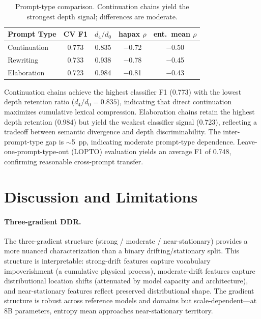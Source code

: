 \documentclass[11pt,a4paper]{article}
\begin{document}
\begin{table}[t]
\centering
\small
\caption{Prompt-type comparison. Continuation chains yield the strongest depth signal; differences are moderate.}
\label{tab:prompt}
\begin{tabular}{lcccc}
\toprule
\textbf{Prompt Type} & \textbf{CV F1} & \textbf{$d_4/d_0$} & \textbf{hapax $\rho$} & \textbf{ent.\ mean $\rho$} \\
\midrule
Continuation & 0.773 & 0.835 & $-$0.72 & $-$0.50 \\
Rewriting & 0.733 & 0.938 & $-$0.78 & $-$0.45 \\
Elaboration & 0.723 & 0.984 & $-$0.81 & $-$0.43 \\
\bottomrule
\end{tabular}
\end{table}

Continuation chains achieve the highest classifier F1 (0.773) with the lowest depth retention ratio ($d_4/d_0 = 0.835$), indicating that direct continuation maximizes cumulative lexical compression.
Elaboration chains retain the highest depth retention (0.984) but yield the weakest classifier signal (0.723), reflecting a tradeoff between semantic divergence and depth discriminability.
The inter-prompt-type gap is $\sim$5~pp, indicating moderate prompt-type dependence.
Leave-one-prompt-type-out (LOPTO) evaluation yields an average F1 of 0.748, confirming reasonable cross-prompt transfer.

\section{Discussion and Limitations}

\paragraph{Three-gradient DDR.}
The three-gradient structure (strong / moderate / near-stationary) provides a more nuanced characterization than a binary drifting/stationary split.
This structure is interpretable: strong-drift features capture vocabulary impoverishment (a cumulative physical process), moderate-drift features capture distributional location shifts (attenuated by model capacity and architecture), and near-stationary features reflect preserved distributional shape.
The gradient structure is robust across reference models and domains but scale-dependent---at 8B parameters, entropy mean approaches near-stationary territory.
\end{document}
